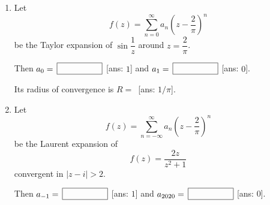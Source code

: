 \documentclass{amsart}
\begin{document}
\begin{enumerate}
    \item Let
    \[
        f(z)=\sum_{n=0}^\infty a_n\left(z-\frac2\pi\right)^n
    \]
    be the Taylor expansion of \(\sin \dfrac1z\) around \(z=\dfrac2\pi\).

    \bigskip\noindent
    Then \(a_0=\,\fbox{$\phantom{A}\qquad\qquad$}\) [ans: $1$] and \(a_1=\,\fbox{$\phantom{A}\qquad\qquad$}\) [ans: $0$].

    \bigskip\noindent
    Its radius of convergence is \(R=\,\)\fbox{$\phantom{A}\qquad\qquad$} [ans: $1/\pi$].

    \item Let
    \[
        f(z)=\sum_{n=-\infty}^\infty a_n\left(z-\frac2\pi\right)^n
    \]
    be the Laurent expansion of
    \[
        f(z)=\frac{2z}{z^2+1}
    \]
    convergent in \(|z-i|>2\).
    
    \bigskip\noindent
    Then \(a_{-1}=\,\fbox{$\phantom{A}\qquad\qquad$}\) [ans: $1$] and \(a_{2020}=\,\fbox{$\phantom{A}\qquad\qquad$}\) [ans: $0$].
\end{enumerate}
\end{document}
